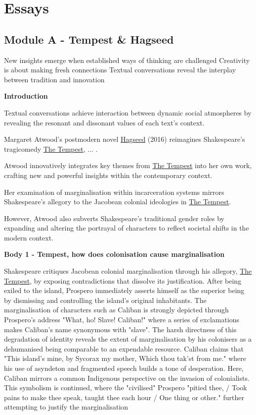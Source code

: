 \chapter{Essays}

\section{Module A - Tempest \& Hagseed}

	New insights emerge when established ways of thinking are challenged
	Creativity is about making fresh connections
	Textual conversations reveal the interplay between tradition and innovation

	\textbf{Introduction}

	Textual conversations achieve interaction between dynamic social atmospheres by revealing the resonant and dissonant values of each text's context.

	Margaret Atwood's postmodern novel \underline{Hagseed} (2016) reimagines Shakespeare's tragicomedy \underline{The Tempest}, ... .

	Atwood innovatively integrates key themes from \underline{The Tempest} into her own work, crafting new and powerful insights within the contemporary context.

	Her examination of marginalisation within incarceration systems mirrors Shakespeare's allegory to the Jacobean colonial ideologies in \underline{The Tempest}.

	However, Atwood also subverts Shakespeare's traditional gender roles by expanding and altering the portrayal of characters to reflect societal shifts in the modern context.


	\textbf{Body 1 - Tempest, how does colonisation cause marginalisation}

	Shakespeare critiques Jacobean colonial marginalisation through his allegory, \underline{The Tempest}, by exposing contradictions that dissolve its justification. After being exiled to the island, Prospero immediately asserts himself as the superior being by dismissing and controlling the island's original inhabitants.
	The marginalisation of characters such as Caliban is strongly depicted through Prospero's address "What, ho! Slave! Caliban!" where a series of exclamations makes Caliban's name synonymous with "slave". The harsh directness of this degradation of identity reveals the extent of marginalisation by his colonisers as a dehumanised being comparable to an expendable resource.
	Caliban claims that "This island’s mine, by Sycorax my mother, Which thou tak’st from me." where his use of asyndeton and fragmented speech builds a tone of desperation. Here, Caliban mirrors a common Indigenous perspective on the invasion of colonialists. This symbolism is continued, where the "civilised" Prospero "pitied thee, / Took pains to make thee speak, taught thee each hour / One thing or other." further attempting to justify the marginalisation


